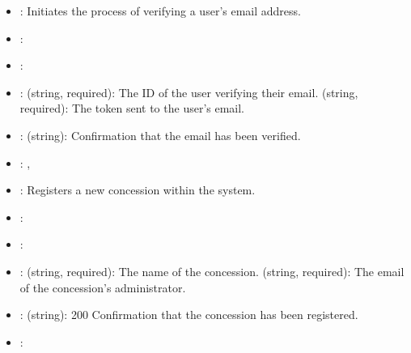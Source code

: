 \documentclass[letterpaper,10pt,english]{sphinxmanual}
\begin{document}
\sphinxAtStartPar
{}
\begin{itemize}
\item {} 
\sphinxAtStartPar
{}: Initiates the process of verifying a user’s email address.

\item {} 
\sphinxAtStartPar
{}: 

\item {} 
\sphinxAtStartPar
{}: 

\item {} 
\sphinxAtStartPar
{}:
\sphinxhyphen{}  (string, required): The ID of the user verifying their email.
\sphinxhyphen{}  (string, required): The token sent to the user’s email.

\item {} 
\sphinxAtStartPar
{}:
\sphinxhyphen{}  (string): Confirmation that the email has been verified.

\item {} 
\sphinxAtStartPar
{}: , 

\end{itemize}

\sphinxAtStartPar
{}
\begin{itemize}
\item {} 
\sphinxAtStartPar
{}: Registers a new concession within the system.

\item {} 
\sphinxAtStartPar
{}: 

\item {} 
\sphinxAtStartPar
{}: 

\item {} 
\sphinxAtStartPar
{}:
\sphinxhyphen{}  (string, required): The name of the concession.
\sphinxhyphen{}  (string, required): The email of the concession’s administrator.

\item {} 
\sphinxAtStartPar
{}:
\sphinxhyphen{}  (string): 200 \textendash{} Confirmation that the concession has been registered.

\item {} 
\sphinxAtStartPar
{}: 

\end{itemize}
\end{document}
